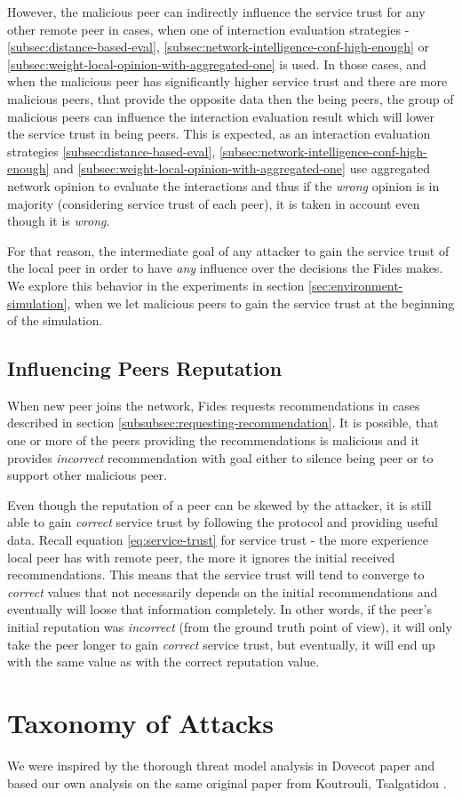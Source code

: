 However, the malicious peer can indirectly influence the service trust for any other remote peer in cases, when one of interaction evaluation strategies - \ref{subsec:distance-based-eval}, \ref{subsec:network-intelligence-conf-high-enough} or \ref{subsec:weight-local-opinion-with-aggregated-one} is used.
In those cases, and when the malicious peer has significantly higher service trust and there are more malicious peers, that provide the opposite data then the being peers, the group of malicious peers can influence the interaction evaluation result which will lower the service trust in being peers.
This is expected, as an interaction evaluation strategies \ref{subsec:distance-based-eval}, \ref{subsec:network-intelligence-conf-high-enough} and \ref{subsec:weight-local-opinion-with-aggregated-one} use aggregated network opinion to evaluate the interactions and thus if the \textit{wrong} opinion is in majority (considering service trust of each peer), it is taken in account even though it is \textit{wrong}.

For that reason, the intermediate goal of any attacker to gain the service trust of the local peer in order to have \textit{any} influence over the decisions the Fides makes.
We explore this behavior in the experiments in section \ref{sec:environment-simulation}, when we let malicious peers to gain the service trust at the beginning of the simulation.

\subsection{Influencing Peers Reputation}
\label{subsec:influencing-peers-reputation}
When new peer joins the network, Fides requests recommendations in cases described in section \ref{subsubsec:requesting-recommendation}.
It is possible, that one or more of the peers providing the recommendations is malicious and it provides \textit{incorrect} recommendation with goal either to silence being peer or to support other malicious peer.

Even though the reputation of a peer can be skewed by the attacker, it is still able to gain \textit{correct} service trust by following the protocol and providing useful data.
Recall equation \ref{eq:service-trust} for service trust - the more experience local peer has with remote peer, the more it ignores the initial received recommendations.
This means that the service trust will tend to converge to \textit{correct} values that not necessarily depends on the initial recommendations and eventually will loose that information completely.
In other words, if the peer's initial reputation was \textit{incorrect} (from the ground truth point of view), it will only take the peer longer to gain \textit{correct} service trust, but eventually, it will end up with the same value as with the correct reputation value.

\section{Taxonomy of Attacks}
\label{sec:taxonomy-of-attacks}
We were inspired by the thorough threat model analysis in Dovecot \cite{dita} paper and based our own analysis on the same original paper from Koutrouli, Tsalgatidou \cite{KOUTROULI201247}.
